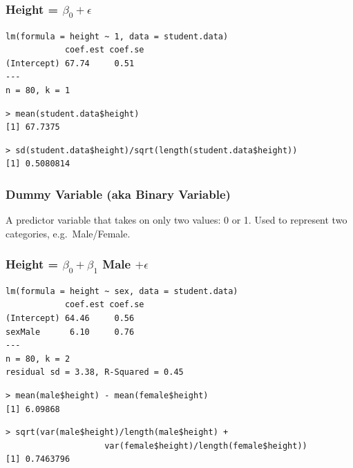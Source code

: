\documentclass[handout]{beamer}
\begin{document}
\begin{frame}[fragile]
\frametitle{Height = $\beta_0 +  \epsilon$}
\footnotesize
\begin{verbatim}
lm(formula = height ~ 1, data = student.data)
            coef.est coef.se
(Intercept) 67.74     0.51  
---
n = 80, k = 1
\end{verbatim}
\pause
\begin{verbatim}
> mean(student.data$height)
[1] 67.7375
\end{verbatim}
\pause
\begin{verbatim}
> sd(student.data$height)/sqrt(length(student.data$height))
[1] 0.5080814
\end{verbatim}
\end{frame}

\begin{frame}
\frametitle{Dummy Variable (aka Binary Variable)}
 
A predictor variable that takes on only two values: 0 or 1. Used to represent two categories, e.g.\ Male/Female.
\end{frame}



\begin{frame}[fragile]
\frametitle{Height = $\beta_0 + \beta_1$ Male $+ \epsilon$}

\footnotesize
\begin{verbatim}
lm(formula = height ~ sex, data = student.data)
            coef.est coef.se
(Intercept) 64.46     0.56  
sexMale      6.10     0.76  
---
n = 80, k = 2
residual sd = 3.38, R-Squared = 0.45
\end{verbatim}
\pause
\begin{verbatim}
> mean(male$height) - mean(female$height)
[1] 6.09868
\end{verbatim}
\pause
\begin{verbatim}
> sqrt(var(male$height)/length(male$height) +
		 			var(female$height)/length(female$height))
[1] 0.7463796
\end{verbatim}
\end{frame}


\end{document}
